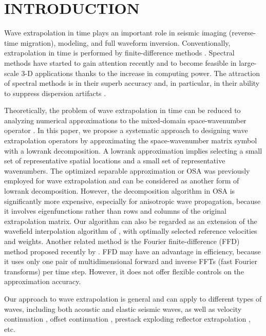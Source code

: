 \section{INTRODUCTION}

Wave extrapolation in time plays an important role in seismic imaging
(reverse-time migration), modeling, and full waveform
inversion. Conventionally, extrapolation in time is performed by
finite-difference methods \cite[]{Etgen.sep.48.133}. Spectral methods
\cite[]{GPR35-05-04790490,GEO53-09-11751183} have started to 
gain attention recently and to become feasible in large-scale 3-D
applications thanks to the increase in computing power. The
attraction of spectral methods is in their superb accuracy and, in
particular, in their ability to suppress dispersion artifacts
\cite[]{chunlei,etgen}.

Theoretically, the problem of wave extrapolation in time can be
reduced to analyzing numerical approximations to the mixed-domain
space-wavenumber operator \cite[]{wards}. In this paper, we propose a
systematic approach to designing wave extrapolation operators by
approximating the space-wavenumb\-er matrix symbol with a lowrank
decomposition. A lowrank approximation implies selecting a small set
of representative spatial locations and a small set of representative
wavenumbers. The optimized separable approximation or OSA
\cite[]{song} was previously employed for wave extrapolation 
\cite[]{zhang,du} and can be considered as another form of lowrank decomposition. However, the
decomposition algorithm in OSA is significantly more expensive,
especially for anisotropic wave propagation, because it involves
eigenfunctions rather than rows and columns of the original
extrapolation matrix. Our algorithm can also be regarded as an
extension of the wavefield interpolation algorithm of \cite{etgen},
with optimally selected reference velocities and weights. Another
related method is the Fourier finite-difference (FFD) method proposed
recently by \cite{song2010b}. FFD may have an advantage in efficiency, because
it uses only one pair of multidimensional forward and inverse
FFTs (fast Fourier transforms) per time step. However, it does not
offer flexible controls on the approximation accuracy.

Our approach to wave extrapolation is general and can apply to
different types of waves, including both acoustic and elastic seismic
waves, as well as velocity continuation \cite[]{GEO68-05-16501661},
offset continuation \cite[]{GEO68-02-07180732}, prestack exploding
reflector extrapolation \cite[]{perm}, etc.

